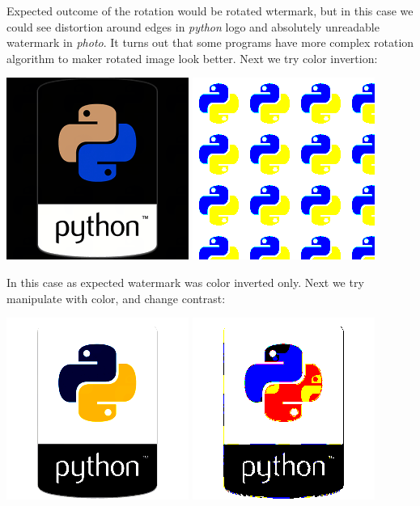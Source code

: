 \documentclass[a4paper, 12pt]{article}
\begin{document}
    	Expected outcome of the rotation would be rotated wtermark, but in this case we could see distortion around edges in \textit{python} logo and absolutely unreadable watermark in \textit{photo}. It turns out that some programs have more complex rotation algorithm to maker rotated image look better. Next we try color invertion:

    	\includegraphics[scale=1.0]{python_lsb/watermark_python_invert.png}
    	\includegraphics[scale=1.0]{python_lsb/watermark_watermark_python_inver.png}

    	In this case as expected watermark was color inverted only. Next we try manipulate with color, and change contrast:

    	\includegraphics[scale=1.0]{python_lsb/watermark_python_colMod.png}
    	\includegraphics[scale=1.0]{python_lsb/watermark_watermark_python_colMod.png}
\end{document}
